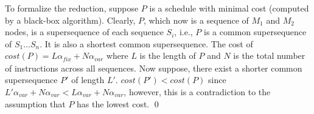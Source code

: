 To formalize the reduction, suppose $P$ is a schedule with minimal cost (computed by a black-box algorithm). 
Clearly, $P$, which now is a sequence of $M_1$ and $M_2$ nodes, is a supersequence of each sequence $S_i$, i.e., $P$ is a common supersequence of $S_1 \dots S_n$. It is also a shortest common supersequence. 
The cost of $\mathit{cost}(P) = L\alpha_\mathit{fix}+N\alpha_\mathit{var}$ where $L$ is the length of $P$ and $N$ is the total number of instructions across all sequences. %
Now suppose, there exist a shorter common supersequence $P'$ of length $L'$. $\mathit{cost}(P') < \mathit{cost}(P)$ since $L'\alpha_\mathit{var} + N\alpha_\mathit{var} < L\alpha_\mathit{var} + N\alpha_\mathit{var}$, however, this is a contradiction to the assumption that $P$ has the lowest cost. \qed


